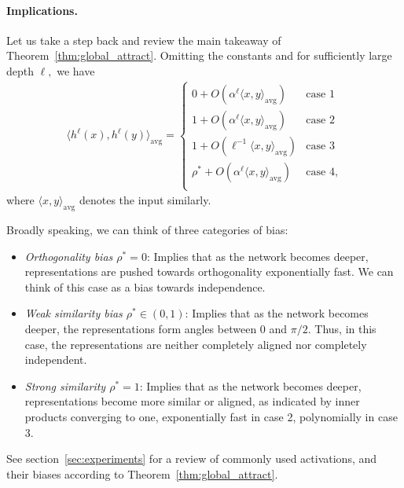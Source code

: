 \documentclass[twoside]{article}
\newcommand{\avg}{\text{avg}}
\theoremstyle{definition}
\begin{document}
\paragraph{Implications.}  Let us take a step back and review the main takeaway of Theorem~\ref{thm:global_attract}. Omitting the constants and for sufficiently large depth $\ell,$ we have 
\begin{align*}
    \langle h^{\ell}(x), h^{\ell}(y)\rangle_\avg =  \begin{cases}
          0+ O(\alpha ^ \ell \langle x, y \rangle_\avg)  & \text{case 1}\\
         1 + O(\alpha ^ \ell \langle x, y \rangle_\avg)  & \text{case 2}\\
         1 + O \left(\ell^{-1}\langle x, y \rangle_\avg \right)   & \text{case 3}\\
         \rho^* + O(\alpha ^ \ell \langle x, y \rangle_\avg)  & \text{case 4},\\
    \end{cases}
\end{align*}
where $\langle x,y\rangle_\avg $ denotes the input similarly. 

Broadly speaking, we can think of three categories of bias:

\begin{itemize}
    \item \textit{Orthogonality bias $\rho^*=0$}: Implies that as the network becomes deeper, representations are pushed towards orthogonality exponentially fast. We can think of this case as a bias towards independence. 
    \item \textit{Weak similarity bias $\rho^*\in (0,1)$}: Implies that as the network becomes deeper, the representations form angles between $0$ and $\pi/2$. Thus, in this case, the representations are neither completely aligned nor completely independent. 
    \item \textit{Strong similarity $\rho^*=1$}: Implies that as the network becomes deeper, representations become more similar or aligned, as indicated by inner products converging to one, exponentially fast in case 2, polynomially in case 3. 
\end{itemize}

See section~\ref{sec:experiments} for a review of commonly used activations, and their biases according to Theorem~\ref{thm:global_attract}.
\end{document}
